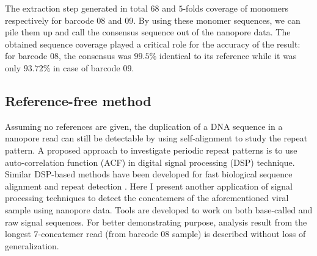 The extraction step generated in total $68$ and $5$-folds coverage of monomers respectively for barcode 08 and 09. By using these monomer sequences, we can pile them up and call the consensus sequence out of the nanopore data. The obtained sequence coverage played a critical role for the accuracy of the result: for barcode 08, the consensus was $99.5\%$ identical to its reference while it was only $93.72\%$ in case of barcode 09. 

\subsection{Reference-free method}
Assuming no references are given, the duplication of a DNA sequence in a nanopore read can still be detectable by using self-alignment to study the repeat pattern.
A proposed approach to investigate periodic repeat patterns is to use auto-correlation function (ACF) in digital signal processing (DSP) technique.
Similar DSP-based methods have been developed for fast biological sequence alignment and repeat detection \cite{Rockwood2005crosscorrelation,Ravi2007tandem}.
Here I present another application of signal processing techniques to detect the concatemers of the aforementioned viral sample using nanopore data. 
Tools are developed to work on both base-called and raw signal sequences.
For better demonstrating purpose, analysis result from the longest 7-concatemer read (from barcode 08 sample) is described without loss of generalization.

